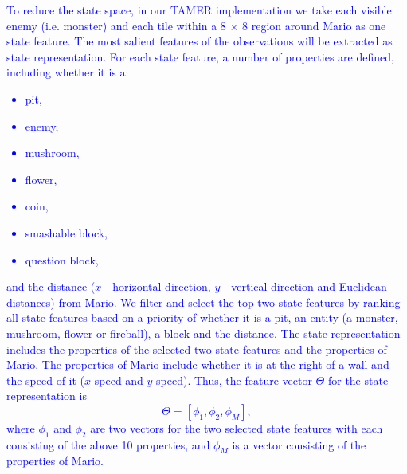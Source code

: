 \textcolor{blue}{To reduce the state space, in our TAMER implementation we take each visible enemy (i.e. monster) and each tile within a 8 $\times$ 8 region around Mario as one state feature. The most salient features of the observations will be extracted as state representation. 
For each state feature, a number of properties are defined, including whether it is a: 
\begin{itemize}
\item pit, 
\item enemy, 
\item mushroom, 
\item flower, 
\item coin, 
\item smashable block,
\item question block, 
\end{itemize}
and the distance ($x$---horizontal direction, $y$---vertical direction and Euclidean distances) from Mario. 
We filter and select the top two state features %
by ranking all state features based on a priority of whether it is a pit, an entity (a monster, mushroom, flower or fireball), a block and the distance.
The state representation includes the properties of the selected two state features and the properties of Mario.  
The properties of Mario include whether it is at the right of a wall and the speed of it ($x$-speed and $y$-speed). Thus, the feature vector $\Theta$ for the state representation is 
\begin{equation}
\label{eqn:sr}
 \Theta = [\phi_{1}, \phi_{2}, \phi_{M}],
\end{equation}
where $\phi_{1}$ and $\phi_{2}$ are two vectors for the two selected state features with each consisting of the above 10 properties, and $\phi_{M}$ is a vector consisting of the properties of Mario.}

